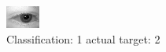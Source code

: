 \begin{figure}[h!]
\begin{center}
\includegraphics[width=0.60\columnwidth]{figures/ID436_class_1_target_2.png}
\end{center}
\caption{ Classification: 1 actual target: 2}
\label{fig:ID436_class_1_target_2}
\end{figure}
